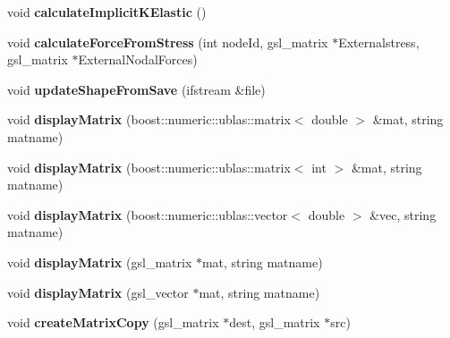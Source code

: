 \begin{DoxyCompactItemize}
\item 
\hypertarget{classShapeBase_a922c41864d4826725cc72089046f818c}{}void {\bfseries calculate\+Implicit\+K\+Elastic} ()\label{classShapeBase_a922c41864d4826725cc72089046f818c}

\item 
\hypertarget{classShapeBase_a6a9f16ddb320974584323d78ca4aec9c}{}void {\bfseries calculate\+Force\+From\+Stress} (int node\+Id, gsl\+\_\+matrix $\ast$Externalstress, gsl\+\_\+matrix $\ast$External\+Nodal\+Forces)\label{classShapeBase_a6a9f16ddb320974584323d78ca4aec9c}

\item 
\hypertarget{classShapeBase_ae5a4fc509efc12d24cf90ea71dee3c27}{}void {\bfseries update\+Shape\+From\+Save} (ifstream \&file)\label{classShapeBase_ae5a4fc509efc12d24cf90ea71dee3c27}

\item 
\hypertarget{classShapeBase_a488d30bfef98b1f1786d8d2b8ec17b99}{}void {\bfseries display\+Matrix} (boost\+::numeric\+::ublas\+::matrix$<$ double $>$ \&mat, string matname)\label{classShapeBase_a488d30bfef98b1f1786d8d2b8ec17b99}

\item 
\hypertarget{classShapeBase_a32973247ffcf77c2fd03f5d00c9fda42}{}void {\bfseries display\+Matrix} (boost\+::numeric\+::ublas\+::matrix$<$ int $>$ \&mat, string matname)\label{classShapeBase_a32973247ffcf77c2fd03f5d00c9fda42}

\item 
\hypertarget{classShapeBase_ae121abd34a8206b1f6e6829987ddf5c6}{}void {\bfseries display\+Matrix} (boost\+::numeric\+::ublas\+::vector$<$ double $>$ \&vec, string matname)\label{classShapeBase_ae121abd34a8206b1f6e6829987ddf5c6}

\item 
\hypertarget{classShapeBase_a51b06b089203d187455c97065ad57499}{}void {\bfseries display\+Matrix} (gsl\+\_\+matrix $\ast$mat, string matname)\label{classShapeBase_a51b06b089203d187455c97065ad57499}

\item 
\hypertarget{classShapeBase_af9a10295e67e1f9047d0800ec6b30b0c}{}void {\bfseries display\+Matrix} (gsl\+\_\+vector $\ast$mat, string matname)\label{classShapeBase_af9a10295e67e1f9047d0800ec6b30b0c}

\item 
\hypertarget{classShapeBase_a4b37ec963a6078a7e03512d23470c257}{}void {\bfseries create\+Matrix\+Copy} (gsl\+\_\+matrix $\ast$dest, gsl\+\_\+matrix $\ast$src)\label{classShapeBase_a4b37ec963a6078a7e03512d23470c257}


\end{DoxyCompactItemize}
